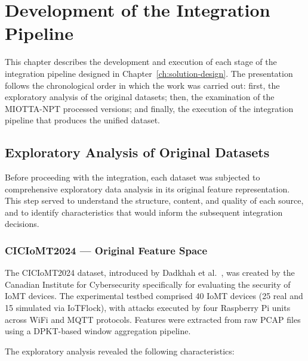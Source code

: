 \chapter{Development of the Integration Pipeline}
\label{ch:execution}

This chapter describes the development and execution of each stage of the integration pipeline designed in Chapter~\ref{ch:solution-design}. The presentation follows the chronological order in which the work was carried out: first, the exploratory analysis of the original datasets; then, the examination of the MIOTTA-NPT processed versions; and finally, the execution of the integration pipeline that produces the unified dataset.

\section{Exploratory Analysis of Original Datasets}
\label{sec:eda-original}

Before proceeding with the integration, each dataset was subjected to comprehensive exploratory data analysis in its original feature representation. This step served to understand the structure, content, and quality of each source, and to identify characteristics that would inform the subsequent integration decisions.

\subsection{CICIoMT2024 --- Original Feature Space}
\label{subsec:eda-ciciomt}

The CICIoMT2024 dataset, introduced by Dadkhah et al.~\cite{dadkhah2024ciciomt}, was created by the Canadian Institute for Cybersecurity specifically for evaluating the security of IoMT devices. The experimental testbed comprised 40 IoMT devices (25 real and 15 simulated via IoTFlock), with attacks executed by four Raspberry Pi units across WiFi and MQTT protocols. Features were extracted from raw PCAP files using a DPKT-based window aggregation pipeline.

The exploratory analysis revealed the following characteristics:

